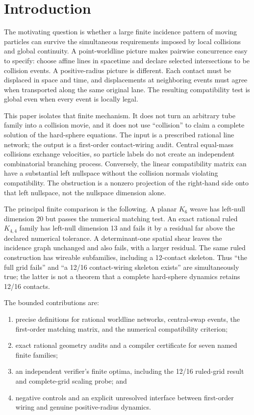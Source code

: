 \documentclass[11pt]{article}
\theoremstyle{definition}
\theoremstyle{remark}
\begin{document}
\section{Introduction}

The motivating question is whether a large finite incidence pattern of moving particles can survive the simultaneous requirements imposed by local collisions and global continuity. A point-worldline picture makes pairwise concurrence easy to specify: choose affine lines in spacetime and declare selected intersections to be collision events. A positive-radius picture is different. Each contact must be displaced in space and time, and displacements at neighboring events must agree when transported along the same original lane. The resulting compatibility test is global even when every event is locally legal.

This paper isolates that finite mechanism. It does not turn an arbitrary tube family into a collision movie, and it does not use ``collision'' to claim a complete solution of the hard-sphere equations. The input is a prescribed rational line network; the output is a first-order contact-wiring audit. Central equal-mass collisions exchange velocities, so particle labels do not create an independent combinatorial branching process. Conversely, the linear compatibility matrix can have a substantial left nullspace without the collision normals violating compatibility. The obstruction is a nonzero projection of the right-hand side onto that left nullspace, not the nullspace dimension alone.

The principal finite comparison is the following. A planar $K_6$ weave has left-null dimension 20 but passes the numerical matching test. An exact rational ruled $K_{4,4}$ family has left-null dimension 13 and fails it by a residual far above the declared numerical tolerance. A determinant-one spatial shear leaves the incidence graph unchanged and also fails, with a larger residual. The same ruled construction has wireable subfamilies, including a 12-contact skeleton. Thus ``the full grid fails'' and ``a 12/16 contact-wiring skeleton exists'' are simultaneously true; the latter is not a theorem that a complete hard-sphere dynamics retains 12/16 contacts.

The bounded contributions are:
\begin{enumerate}[leftmargin=2em]
\item precise definitions for rational worldline networks, central-swap events, the first-order matching matrix, and the numerical compatibility criterion;
\item exact rational geometry audits and a compiler certificate for seven named finite families;
\item an independent verifier's finite optima, including the 12/16 ruled-grid result and complete-grid scaling probe; and
\item negative controls and an explicit unresolved interface between first-order wiring and genuine positive-radius dynamics.
\end{enumerate}
\end{document}
